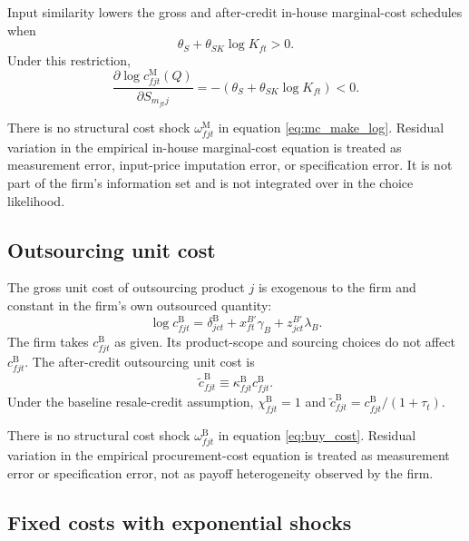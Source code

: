 \documentclass[11pt,a4paper]{article}
\newcommand{\M}{\mathrm{M}}
\newcommand{\B}{\mathrm{B}}
\begin{document}
Input similarity lowers the gross and after-credit in-house marginal-cost schedules when
\begin{equation}
    \theta_S+\theta_{SK}\log K_{ft}>0.
    \label{eq:input_restriction}
\end{equation}
Under this restriction,
\begin{equation}
    \frac{\partial\log c^{\M}_{fjt}(Q)}{\partial S_{m_{ft}j}}
    =-\left(\theta_S+\theta_{SK}\log K_{ft}\right)<0.
    \label{eq:mc_input_derivative}
\end{equation}

There is no structural cost shock $\omega^{\M}_{fjt}$ in equation \eqref{eq:mc_make_log}. Residual variation in the empirical in-house marginal-cost equation is treated as measurement error, input-price imputation error, or specification error. It is not part of the firm's information set and is not integrated over in the choice likelihood.

\subsection{Outsourcing unit cost}

The gross unit cost of outsourcing product $j$ is exogenous to the firm and constant in the firm's own outsourced quantity:
\begin{equation}
    \log c^{\B}_{fjt}
    =\delta^{\B}_{jct}
    +x^{B\prime}_{ft}\gamma_B
    +z^{B\prime}_{jct}\lambda_B.
    \label{eq:buy_cost}
\end{equation}
The firm takes $c^{\B}_{fjt}$ as given. Its product-scope and sourcing choices do not affect $c^{\B}_{fjt}$. The after-credit outsourcing unit cost is
\begin{equation}
    \widetilde c^{\B}_{fjt}\equiv \kappa^{\B}_{fjt}c^{\B}_{fjt}.
    \label{eq:cB_tilde}
\end{equation}
Under the baseline resale-credit assumption, $\chi^{\B}_{fjt}=1$ and $\widetilde c^{\B}_{fjt}=c^{\B}_{fjt}/(1+\tau_t)$.

There is no structural cost shock $\omega^{\B}_{fjt}$ in equation \eqref{eq:buy_cost}. Residual variation in the empirical procurement-cost equation is treated as measurement error or specification error, not as payoff heterogeneity observed by the firm.

\subsection{Fixed costs with exponential shocks}
\end{document}

